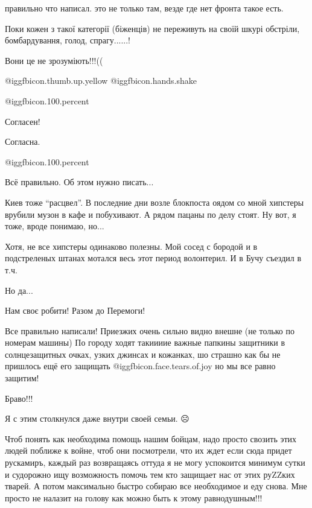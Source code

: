 \begin{itemize}
правильно что написал. это не только там, везде где нет фронта такое есть.


Поки кожен з такої категорії (біженців) не переживуть на своїй шкурі обстріли,
бомбардування, голод, спрагу......!

Вони це не зрозуміють!!!((

 @igg{fbicon.thumb.up.yellow}  @igg{fbicon.hands.shake} 

 @igg{fbicon.100.percent} 

Согласен!

Согласна.

 @igg{fbicon.100.percent} 

Всё правильно.
Об этом нужно писать...


Киев тоже \enquote{расцвел}. В последние дни возле блокпоста оядом со мной хипстеры
врубили музон в кафе и побухивают. А рядом пацаны по делу стоят. Ну вот, я
тоже, вроде понимаю, но...

Хотя, не все хипстеры одинаково полезны. Мой сосед с бородой и в подстреленых
штанах мотался весь этот период волонтерил. И в Бучу съездил в т.ч.

Но да...

Нам своє робити! Разом до Перемоги!


Все правильно написали! Приезжих очень сильно видно внешне (не только по
номерам машины) По городу ходят такиииие важные папкины защитники в
солнцезащитных очках, узких джинсах и кожанках, шо страшно как бы не пришлось
ещё его защищать  @igg{fbicon.face.tears.of.joy}  но мы все равно защитим!

Браво!!!

Я с этим столкнулся даже внутри своей семьи. ☹️


Чтоб понять как необходима помощь нашим бойцам, надо просто свозить этих людей
поближе к войне, чтоб они посмотрели, что их ждет если сюда придет рускамиръ,
каждый раз возвращаясь оттуда я не могу успокоится минимум сутки и судорожно
ищу возможность помочь тем кто защищает нас от этих руZZких тварей. А потом
максимально быстро собираю все необходимое и еду снова. Мне просто не налазит
на голову как можно быть к этому равнодушным!!!


\end{itemize}
